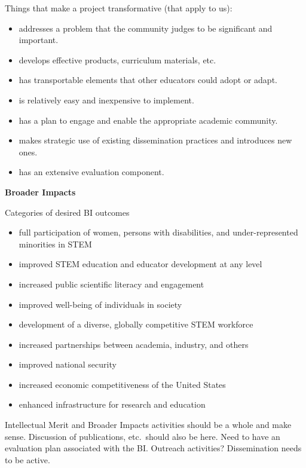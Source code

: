 \documentclass[12pt]{article}
\begin{document}
\vspace{1em}
\noindent Things that make a project transformative (that apply to us):
\begin{itemize}
\item addresses a problem that the community judges to be significant and
  important.
\item develops effective products, curriculum materials, etc.
\item has transportable elements that other educators could adopt or adapt.
\item is relatively easy and inexpensive to implement.
\item has a plan to engage and enable the appropriate academic community.
\item makes strategic use of existing dissemination practices and introduces
  new ones.
\item has an extensive evaluation component.
\end{itemize}


\vspace{2em}
\noindent \textbf{Broader Impacts}

\vspace{1em}
\noindent Categories of desired BI outcomes
\begin{itemize}
\item full participation of women, persons with disabilities, and
  under-represented minorities in STEM
\item improved STEM education and educator development at any level
\item increased public scientific literacy and engagement
\item improved well-being of individuals in society
\item development of a diverse, globally competitive STEM workforce
\item increased partnerships between academia, industry, and others
\item improved national security
\item increased economic competitiveness of the United States
\item enhanced infrastructure for research and education
\end{itemize}

\vspace{1em}
\noindent Intellectual Merit and Broader Impacts activities should be a whole and make
sense. Discussion of publications, etc.\ should also be here. Need to have an
evaluation plan associated with the BI. Outreach activities? Dissemination
needs to be active.
\end{document}

